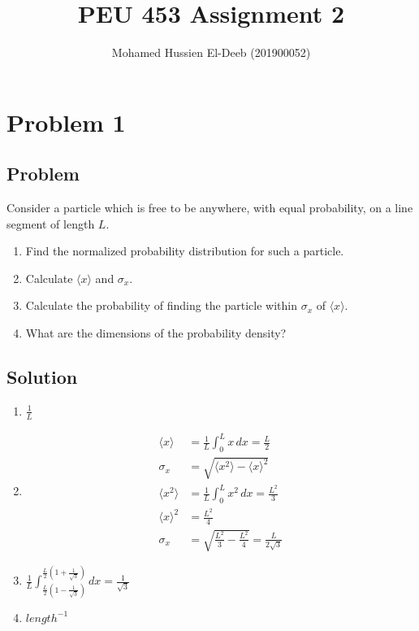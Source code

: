 \documentclass[12pt]{article}
\title{PEU 453 Assignment 2}
\author{Mohamed Hussien El-Deeb (201900052)}
\date{}
\begin{document}
\maketitle
\tableofcontents

\section{Problem 1}

\subsection{Problem}

Consider a particle which is free to be anywhere, with equal probability, on a line segment of length $L$.

\renewcommand{\labelenumi}{(\alph{enumi})}
\begin{enumerate}
    \item Find the normalized probability distribution for such a particle.
    \item Calculate $\langle x\rangle $ and $\sigma_{x}$.
    \item Calculate the probability of finding the particle within $\sigma_{x}$ of $\langle x\rangle $.
    \item What are the dimensions of the probability density?
\end{enumerate}

\subsection{Solution}

\begin{enumerate}
    \item $\frac{1}{L} $
    \item \begin{align*}
              \langle x\rangle      & = \frac{1}{L} \int_{0}^{L} x\,dx = \frac{L}{2}               \\
              \sigma_{x}            & = \sqrt{\langle x^2 \rangle - {\langle x \rangle}^2}         \\
              \langle x^2 \rangle   & = \frac{1}{L} \int_{0}^{L} x^2\,dx = \frac{L^2}{3}           \\
              {\langle x \rangle}^2 & = \frac{L^2}{4}                                              \\
              \sigma_{x}            & = \sqrt{\frac{L^2}{3} - \frac{L^2}{4}} = \frac{L}{2\sqrt{3}}
          \end{align*}
    \item $\frac{1}{L} \int_{\frac{L}{2} (1 - \frac{1}{\sqrt{3}})}^{\frac{L}{2} (1 + \frac{1}{\sqrt{3}})}dx = \frac{1}{\sqrt{3}}$
    \item $length^{-1}$
\end{enumerate}
\end{document}
